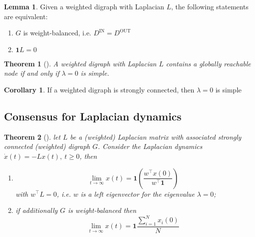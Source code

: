 \documentclass{book}
\theoremstyle{theoremv2}
\newtheorem{theorem}{Theorem}[chapter]
\theoremstyle{defv2}
\theoremstyle{remark}
\theoremstyle{remark}
\theoremstyle{definition}
\newtheorem*{lemma}{Lemma}
\theoremstyle{definition}
\newtheorem*{corollary}{Corollary}
\begin{document}
\begin{lemma}
    Given a weighted digraph with Laplacian $L$, the following statements are equivalent: 
    \begin{enumerate}
        \item $G$ is weight-balanced, i.e. $D^{\text{IN}} = D^{\text{OUT}}$
        \item $\mathbf{1}L = 0$
    \end{enumerate}
\end{lemma}
\begin{theorem}[]
    A weighted digraph with Laplacian $L$ contains a globally reachable node if and only if $\lambda=0$ is simple.
\end{theorem}
\begin{corollary}
    If a weighted digraph is strongly connected, then $\lambda=0$ is simple
\end{corollary}

\subsection{Consensus for Laplacian dynamics}
\begin{theorem}[]
    let $L$ be a (weighted) Laplacian matrix with associated strongly connected (weighted) digraph $G$. Consider the Laplacian dynamics $\dot{x}(t) = -Lx(t),\  t\geq0$, then
    \begin{enumerate}
        \item \[
                \lim_{t\to\infty} x(t) = \mathbf{1}\left(\displaystyle\frac{w^\top x(0)}{w^\top\mathbf{1}}\right)
        \]
            with $w^\top L = 0$, i.e. $w$ is a left eigenvector for the eigenvalue $\lambda=0$;
        \item if additionally $G$ is weight-balanced then 
            \[
                \lim_{t\to\infty}x(t) = \mathbf{1} \displaystyle\frac{\sum_{i=1}^{N}x_i(0)}{N}
            \]
    \end{enumerate}
\end{theorem}
\end{document}
